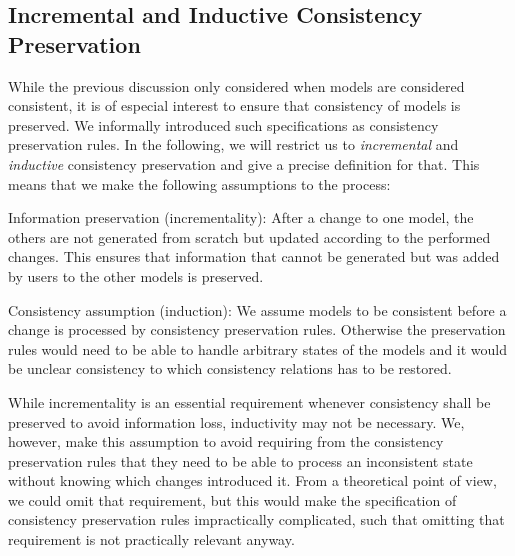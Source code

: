 \subsection{Incremental and Inductive Consistency Preservation}

While the previous discussion only considered when models are considered consistent, it is of especial interest to ensure that consistency of models is preserved.
We informally introduced such specifications as \glspl{consistency preservation rule}.
In the following, we will restrict us to \emph{incremental} and \emph{inductive} consistency preservation and give a precise definition for that.
This means that we make the following assumptions to the process:
\begin{properdescription}
    \item[Information preservation (incrementality):] After a change to one model, the others are not generated from scratch but updated according to the performed changes. This ensures that information that cannot be generated but was added by users to the other models is preserved.
    \item[Consistency assumption (induction):] We assume models to be consistent before a change is processed by \glspl{consistency preservation rule}. Otherwise the preservation rules would need to be able to handle arbitrary states of the models and it would be unclear consistency to which \glspl{consistency relation} has to be restored.
\end{properdescription}
While incrementality is an essential requirement whenever consistency shall be preserved to avoid information loss, inductivity may not be necessary.
We, however, make this assumption to avoid requiring from the \glspl{consistency preservation rule} that they need to be able to process an inconsistent state without knowing which changes introduced it.
From a theoretical point of view, we could omit that requirement, but this would make the specification of \glspl{consistency preservation rule} impractically complicated, such that omitting that requirement is not practically relevant anyway.


